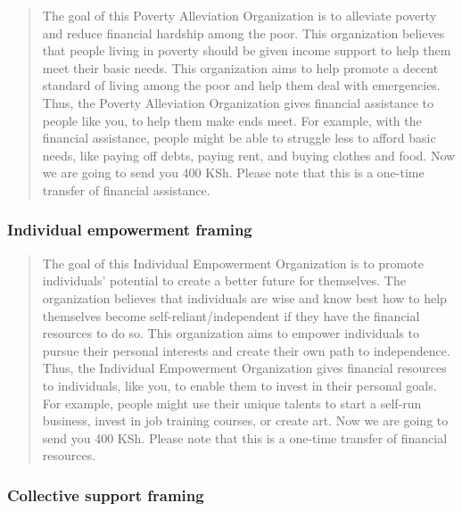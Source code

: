 \documentclass[11pt, a4paper]{article}\usepackage[]{graphicx}\usepackage[]{color}
\begin{document}
            \begin{quote}

                The goal of this Poverty Alleviation Organization is to alleviate poverty and reduce financial hardship among the poor. This organization believes that people living in poverty should be given income support to help them meet their basic needs. This organization aims to help promote a decent standard of living among the poor and help them deal with emergencies. Thus, the Poverty Alleviation Organization gives financial assistance to people like you, to help them make ends meet. For example, with the financial assistance, people might be able to struggle less to afford basic needs, like paying off debts, paying rent, and buying clothes and food. Now we are going to send you 400 KSh. Please note that this is a one-time transfer of financial assistance.

            \end{quote}

        \subsubsection{Individual empowerment framing}

            \begin{quote}

                The goal of this Individual Empowerment Organization is to promote individuals' potential to create a better future for themselves.  The organization believes that individuals are wise and know best how to help themselves become self-reliant/independent if they have the financial resources to do so. This organization aims to empower individuals to pursue their personal interests and create their own path to independence. Thus, the Individual Empowerment Organization gives financial resources to individuals, like you, to enable them to invest in their personal goals. For example, people might use their unique talents to start a self-run business, invest in job training courses, or create art. Now we are going to send you 400 KSh. Please note that this is a one-time transfer of financial resources.

            \end{quote}

        \subsubsection{Collective support framing}
\end{document}
